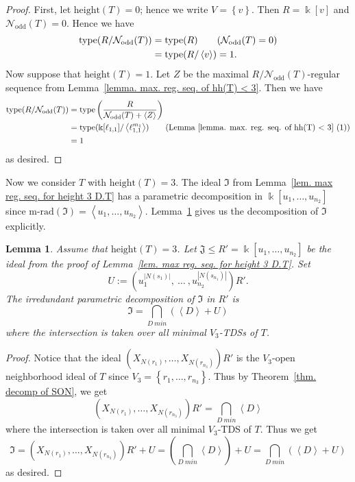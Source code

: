 \documentclass[12pt, reqno]{amsart}
\theoremstyle{definition}
\theoremstyle{plain}
\newtheorem{lemma}[theorem]{Lemma}
\theoremstyle{definition}
\newcommand{\tp}{\mbox{type}}
\newcommand{\hh}{\mbox{height}}
\newcommand{\kk}{\Bbbk}
\newcommand{\mrad}{\mbox{m-rad}}
\newcommand\gen[1]{\left\langle #1 \right\rangle}
\newcommand\set[1]{\left\lbrace #1 \right\rbrace}
\newcommand{\NN}{\mathcal{N}}
\begin{document}
\begin{proof}
    First, let $\hh(T) = 0$; hence we write $V = \set{v}$.
    Then $R = \kk[v]$ and $\NN_{\text{odd}}(T) = 0$.
    Hence we have
    \begin{align*}
        \tp(R/\NN_{\text{odd}}(T)) &= \tp(R) \tag{$\NN_{\text{odd}}(T) = 0$}\\
        &= \tp(R/\gen{v}) = 1.
    \end{align*}
    Now suppose that $\hh(T) = 1$. 
    Let $Z$ be the maximal $R/\NN_{\text{odd}}(T)$-regular sequence from Lemma~\ref{lemma. max. reg. seq. of hh(T) < 3}.
    Then we have
    \begin{align*}
        \tp(R/\NN_{\text{odd}}(T)) &= \tp \left(\frac{R}{\NN_{\text{odd}}(T) + \gen{Z}} \right) \\
        &= \tp(\kk[\ell_{1,1}]/\gen{\ell_{1,1}^{m_1}}) \tag{Lemma~\ref{lemma. max. reg. seq. of hh(T) < 3} (1)}\\
        &= 1 
    \end{align*}
as desired.
\end{proof}

Now we consider $T$ with $\hh(T) = 3$.
The ideal $\mathfrak{I}$ from Lemma~\ref{lem. max reg. seq. for height 3 D.T} has a parametric decomposition in $\kk[u_1,\dots,u_{n_2}]$ since $\mrad(\mathfrak{I}) = \gen{u_1,\dots,u_{n_2}}$.
Lemma~\ref{lem. parametric decomp of I} gives us the decomposition of $\mathfrak{I}$ explicitly.

\begin{lemma}\label{lem. parametric decomp of I}
Assume that $\hh(T) = 3$.
Let $\mathfrak{J} \leq R' = \kk[u_1,\dots,u_{n_2}]$ be the ideal from the proof of Lemma~\ref{lem. max reg. seq. for height 3 D.T}.
Set 
$$
U := \left(u_1^{|N(s_1)|},\ \dots\ , u_{n_2}^{|N(s_{n_1})|}\right)R'.
$$
The irredundant parametric decomposition of $\mathfrak{I}$ in $R'$ is
$$
\mathfrak{I} = \bigcap_{D\ min} \left(\gen D + U\right)
$$
where the intersection is taken over all minimal $V_3$-TDSs of $T$.
\end{lemma}

\begin{proof}
Notice that the ideal $\left( X_{N(r_1)},\dots,X_{N(r_{n_3})} \right)R'$ is the $V_3$-open neighborhood ideal of $T$ since $V_3 = \set{r_1,\dots,r_{n_3}}$.
Thus by Theorem~\ref{thm. decomp of SON}, we get
$$
\left( X_{N(r_1)},\dots,X_{N(r_{n_3})} \right)R' = \bigcap_{D\ min} \gen D
$$
where the intersection is taken over all minimal $V_3$-TDS of $T$.
Thus we get
$$
\mathfrak{I} = \left( X_{N(r_1)},\dots,X_{N(r_{n_3})} \right)R'+ U = \left(\bigcap_{D\ min} \gen D\right) + U =  \bigcap_{D\ min} (\gen D+U)
$$
as desired.
\end{proof}
\end{document}
